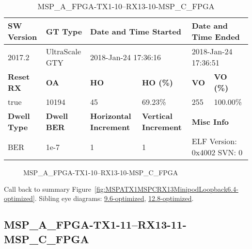 \begin{table}[h]
\centering
\caption{MSP\_A\_FPGA-TX1-10--RX13-10-MSP\_C\_FPGA}
\label{tab:MSPAFPGATX110RX1310MSPCFPGA6.4-optimized}
\begin{tabular}{@{}|l|l|l|l|l|l|@{}}
\toprule
\textbf{SW Version}                & \textbf{GT Type}   & \multicolumn{2}{l|}{\textbf{Date and Time Started}}            & \multicolumn{2}{l|}{\textbf{Date and Time Ended}}        \\ \midrule
2017.2                       & UltraScale GTY          & \multicolumn{2}{l|}{2018-Jan-24 17:36:16}                   & \multicolumn{2}{l|}{2018-Jan-24 17:36:51}               \\ \midrule
\textbf{Reset RX}                  & \textbf{OA} & \textbf{HO}   & \textbf{HO (\%)} & \textbf{VO} & \textbf{VO (\%)} \\ \midrule
true & 10194        & 45          & 69.23\%        & 255        & 100.00\%       \\ \midrule
\textbf{Dwell Type}                & \textbf{Dwell BER} & \textbf{Horizontal Increment} & \textbf{Vertical Increment}    & \multicolumn{2}{l|}{\textbf{Misc Info}}                  \\ \midrule
BER                            & 1e-7        & 1        & 1           & \multicolumn{2}{l|}{ELF Version: 0x4002 SVN: 0}                         \\ \bottomrule
\end{tabular}
\end{table}

\begin{figure}[h]
\caption{MSP\_A\_FPGA-TX1-10--RX13-10-MSP\_C\_FPGA} \label{fig:MSPAFPGATX110RX1310MSPCFPGA6.4-optimized}
\end{figure}

Call back to summary Figure~\ref{fig:MSPATX1MSPCRX13MinipodLoopback6.4-optimized}.
Sibling eye diagrams: \hyperref[sec:MSPAFPGATX110RX1310MSPCFPGA9.6-optimized]{9.6-optimized}, \hyperref[sec:MSPAFPGATX110RX1310MSPCFPGA12.8-optimized]{12.8-optimized}.

\clearpage
\newpage


\subsection{MSP\_A\_FPGA-TX1-11--RX13-11-MSP\_C\_FPGA}\label{sec:MSPAFPGATX111RX1311MSPCFPGA6.4-optimized}

